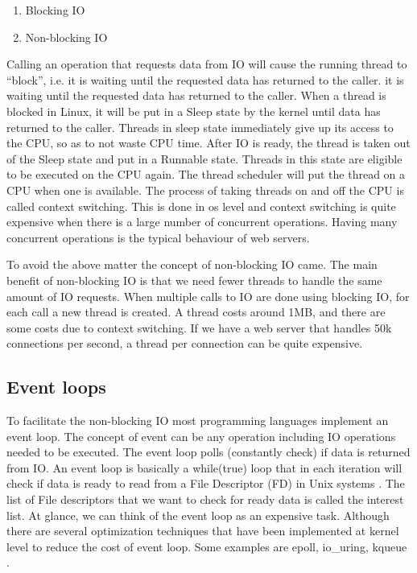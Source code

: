 \begin{enumerate}
	\item Blocking IO
	\item Non-blocking IO
	
\end{enumerate}

Calling an operation that requests data from IO will cause the running thread to “block”, i.e. it is
waiting until the requested data has returned to the caller. it is waiting until the requested data has
returned to the caller. When a thread is blocked in Linux, it will be put in a Sleep state by the kernel
until data has returned to the caller. Threads in sleep state immediately give up its access to the CPU,
so as to not waste CPU time. After IO is ready, the thread is taken out of the Sleep state and put in a
Runnable state. Threads in this state are eligible to be executed on the CPU again. The thread
scheduler will put the thread on a CPU when one is available. The process of taking threads on and off
the CPU is called context switching. This is done in os level and context switching is quite expensive
when there is a large number of concurrent operations. Having many concurrent
operations is the typical behaviour of web servers.

To avoid the above matter the concept of non-blocking IO came. The main benefit of non-blocking IO
is that we need fewer threads to handle the same amount of IO requests. When multiple calls to IO are
done using blocking IO, for each call a new thread is created. A thread costs around 1MB, and there
are some costs due to context switching. If we have a web server that handles 50k connections per
second, a thread per connection can be quite expensive.

\subsection{Event loops}
To facilitate the non-blocking IO most programming languages implement an event loop. The concept
of event can be any operation including IO operations needed to be executed. The event loop polls
(constantly check) if data is returned from IO. An event loop is basically a while(true) loop that in
each iteration will check if data is ready to read from a File Descriptor (FD) in Unix systems \cite{device_file}. The
list of File descriptors that we want to check for ready data is called the interest list. At glance, we can
think of the event loop as an expensive task. Although there are several optimization techniques that
have been implemented at kernel level to reduce the cost of event loop. Some examples are epoll,
io{\_}uring, kqueue \cite{web_pipeline,io_uring}.

